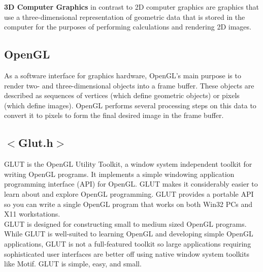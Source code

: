 \documentclass[fontsize=12pt]{article}
\begin{document}
    \textbf{3D Computer Graphics} in contrast to 2D computer graphics are graphics that use a three-dimensional representation of geometric data that is stored in the computer for the purposes of performing calculations and rendering 2D images.\\

\subsection{OpenGL}

As a software interface for graphics hardware, OpenGL's main purpose is to render two- and three-dimensional objects into a frame buffer. These objects are described as sequences of vertices (which define geometric objects) or pixels (which define images). OpenGL  performs several processing steps on this data to convert it to pixels to form the final desired image in the frame buffer.\\

\subsection{$<$Glut.h$>$}

GLUT is the OpenGL Utility Toolkit, a window system independent toolkit for writing OpenGL programs. It implements a simple windowing application programming interface (API) for OpenGL. GLUT makes it considerably easier to learn about and explore OpenGL programming. GLUT provides a portable API so you can write a single OpenGL program that works on both Win32 PCs and X11 workstations.\\

GLUT is designed for constructing small to medium sized OpenGL programs. While GLUT is well-suited to learning OpenGL and developing simple OpenGL applications, GLUT is not a full-featured toolkit so large applications requiring sophisticated user interfaces are better off using native window system toolkits like Motif. GLUT is simple, easy, and small.
\end{document}
